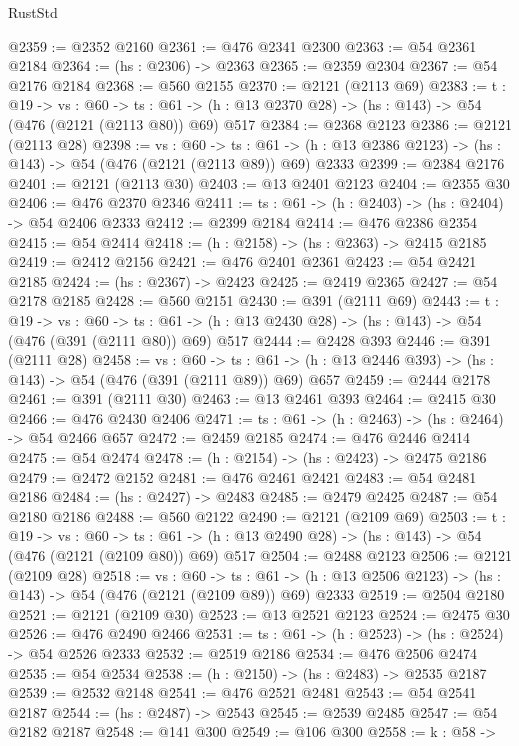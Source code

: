 \begin{lexlean}{RustStd}
\begin{coremodule}
@2359 := @2352 @2160
@2361 := @476 @2341 @2300
@2363 := @54 @2361 @2184
@2364 := (hs : @2306) -> @2363
@2365 := @2359 @2304
@2367 := @54 @2176 @2184
@2368 := @560 @2155
@2370 := @2121 (@2113 @69)
@2383 := {t : @19} ->
  {vs : @60} ->
  {ts : @61} -> (h : @13 @2370 @28) -> (hs : @143) -> @54 (@476 (@2121 (@2113 @80)) @69) @517
@2384 := @2368 @2123
@2386 := @2121 (@2113 @28)
@2398 := {vs : @60} ->
  {ts : @61} -> (h : @13 @2386 @2123) -> (hs : @143) -> @54 (@476 (@2121 (@2113 @89)) @69) @2333
@2399 := @2384 @2176
@2401 := @2121 (@2113 @30)
@2403 := @13 @2401 @2123
@2404 := @2355 @30
@2406 := @476 @2370 @2346
@2411 := {ts : @61} -> (h : @2403) -> (hs : @2404) -> @54 @2406 @2333
@2412 := @2399 @2184
@2414 := @476 @2386 @2354
@2415 := @54 @2414
@2418 := (h : @2158) -> (hs : @2363) -> @2415 @2185
@2419 := @2412 @2156
@2421 := @476 @2401 @2361
@2423 := @54 @2421 @2185
@2424 := (hs : @2367) -> @2423
@2425 := @2419 @2365
@2427 := @54 @2178 @2185
@2428 := @560 @2151
@2430 := @391 (@2111 @69)
@2443 := {t : @19} ->
  {vs : @60} ->
  {ts : @61} -> (h : @13 @2430 @28) -> (hs : @143) -> @54 (@476 (@391 (@2111 @80)) @69) @517
@2444 := @2428 @393
@2446 := @391 (@2111 @28)
@2458 := {vs : @60} ->
  {ts : @61} -> (h : @13 @2446 @393) -> (hs : @143) -> @54 (@476 (@391 (@2111 @89)) @69) @657
@2459 := @2444 @2178
@2461 := @391 (@2111 @30)
@2463 := @13 @2461 @393
@2464 := @2415 @30
@2466 := @476 @2430 @2406
@2471 := {ts : @61} -> (h : @2463) -> (hs : @2464) -> @54 @2466 @657
@2472 := @2459 @2185
@2474 := @476 @2446 @2414
@2475 := @54 @2474
@2478 := (h : @2154) -> (hs : @2423) -> @2475 @2186
@2479 := @2472 @2152
@2481 := @476 @2461 @2421
@2483 := @54 @2481 @2186
@2484 := (hs : @2427) -> @2483
@2485 := @2479 @2425
@2487 := @54 @2180 @2186
@2488 := @560 @2122
@2490 := @2121 (@2109 @69)
@2503 := {t : @19} ->
  {vs : @60} ->
  {ts : @61} -> (h : @13 @2490 @28) -> (hs : @143) -> @54 (@476 (@2121 (@2109 @80)) @69) @517
@2504 := @2488 @2123
@2506 := @2121 (@2109 @28)
@2518 := {vs : @60} ->
  {ts : @61} -> (h : @13 @2506 @2123) -> (hs : @143) -> @54 (@476 (@2121 (@2109 @89)) @69) @2333
@2519 := @2504 @2180
@2521 := @2121 (@2109 @30)
@2523 := @13 @2521 @2123
@2524 := @2475 @30
@2526 := @476 @2490 @2466
@2531 := {ts : @61} -> (h : @2523) -> (hs : @2524) -> @54 @2526 @2333
@2532 := @2519 @2186
@2534 := @476 @2506 @2474
@2535 := @54 @2534
@2538 := (h : @2150) -> (hs : @2483) -> @2535 @2187
@2539 := @2532 @2148
@2541 := @476 @2521 @2481
@2543 := @54 @2541 @2187
@2544 := (hs : @2487) -> @2543
@2545 := @2539 @2485
@2547 := @54 @2182 @2187
@2548 := @141 @300
@2549 := @106 @300
@2558 := {k : @58} ->

\end{coremodule}
\end{lexlean}
